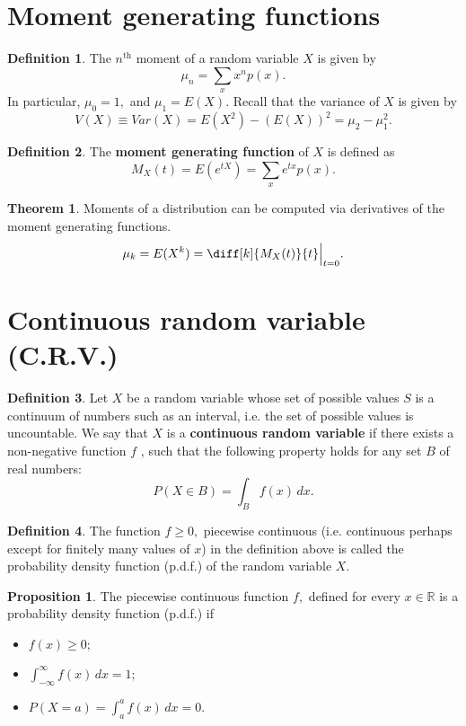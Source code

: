 \documentclass[12pt, a4paper]{article}
\newcommand{\bb}[1]{\mathbb{#1}}
\theoremstyle{definition}
\newtheorem{definition}{Definition}[section]
\newtheorem{theorem}{Theorem}[section]
\newtheorem{proposition}{Proposition}
\theoremstyle{plain}
\begin{document}
\section{Moment generating functions}

\begin{definition}
The $n^{\text{th}}$ moment of a random variable $X$ is given by $$\mu_n=\sum_{x} x^np(x).$$ In particular, $\mu_0=1,$ and $\mu_1=E(X).$ Recall that the variance of $X$ is given by $$V(X)\equiv Var(X)=E(X^2)-(E(X))^2=\mu_2-\mu_1^2.$$
\end{definition}

\begin{definition}
The \textbf{moment generating function} of $X$ is defined as $$M_X(t)=E(e^{tX})=\sum_{x} e^{tx}p(x).$$ 
\end{definition}

\begin{theorem}
Moments of a distribution can be computed via derivatives of the moment generating functions. $$\mu_k=E(X^k)=\diff[k]{M_X(t)}{t}\Big|_{t=0}.$$
\end{theorem}

\section{Continuous random variable (C.R.V.)}

\begin{definition}
Let $X$ be a random variable whose set of possible values $S$ is a continuum of numbers such as an interval, i.e. the set of possible values is uncountable. We say that $X$ is a \textbf{continuous random variable} if there exists a non-negative function $f$ , such that the following property holds for any set $B$ of real numbers: $$P(X\in B)=\int_B f(x)\,dx.$$
\end{definition}

\begin{definition}
The function $f \geq 0,$ piecewise continuous (i.e. continuous perhaps except for finitely many values of $x$) in the definition above is called the probability density function (p.d.f.) of the random variable $X.$
\end{definition}

\begin{proposition}
The piecewise continuous function $f ,$ defined for every $x \in \bb{R}$ is a probability density function (p.d.f.) if \begin{itemize}

	\item $f(x)\geq 0;$
	\item $\int_{-\infty}^{\infty}f(x)\,dx=1;$
	\item $P(X=a)=\int_{a}^{a}f(x)\,dx=0.$

\end{itemize}
\end{proposition}
\end{document}
